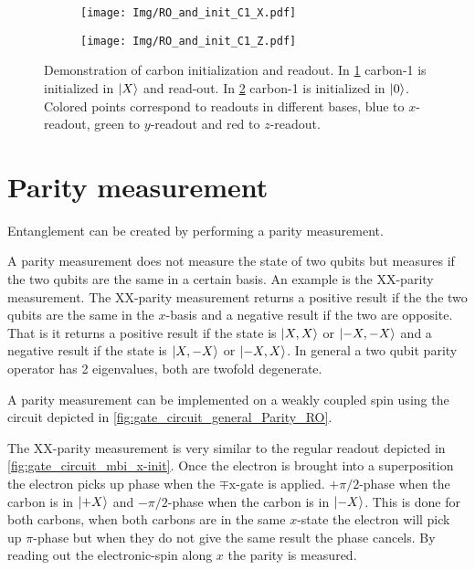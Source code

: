 \begin{figure}[htbp]
    \begin{subfigure}[t]{0.49\textwidth}\centering
        \caption{}
        \texttt{[image: Img/RO\_and\_init\_C1\_X.pdf]}
        \label{fig:carbon_init_x}
    \end{subfigure}
        \begin{subfigure}[t]{0.49\textwidth}\centering
        \caption{}
        \texttt{[image: Img/RO\_and\_init\_C1\_Z.pdf]}
        \label{fig:carbon_init_Z}
    \end{subfigure}
    \caption{Demonstration of carbon initialization and readout. In \cref{fig:carbon_init_x} carbon-1 is initialized in ${\left\vert{X}\right\rangle}$ and read-out. In \cref{fig:carbon_init_Z} carbon-1 is initialized in ${\left\vert{0}\right\rangle}$. Colored points correspond to readouts in different bases, blue to $x$-readout, green to $y$-readout and red to $z$-readout.}
    \label{fig:single_qubit_initialization}
\end{figure}


\section{Parity measurement}
Entanglement can be created by performing a parity measurement.

A parity measurement does not measure the state of two qubits but measures if the two qubits are the same in a certain basis.
An example is the XX-parity measurement.
The XX-parity measurement returns a positive result if the the two qubits are the same in the $x$-basis and a negative result if the two are opposite.
That is it returns a positive result if the state is ${\left\vert{X,X}\right\rangle}$ or ${\left\vert{-X,-X}\right\rangle}$ and a negative result if the state is ${\left\vert{X,-X}\right\rangle}$ or ${\left\vert{-X,X}\right\rangle}$.
In general a two qubit parity operator has 2 eigenvalues, both are twofold degenerate.

A parity measurement can be implemented on a weakly coupled spin using the circuit depicted in \cref{fig:gate_circuit_general_Parity_RO}.

The XX-parity measurement is very similar to the regular readout depicted in \cref{fig:gate_circuit_mbi_x-init}.
Once the electron is brought into a superposition the electron picks up phase when the $\mp \mathrm{x}$-gate is applied.
$+\pi/2$-phase when the carbon is in ${\left\vert{+X}\right\rangle}$ and $-\pi/2$-phase when the carbon is in ${\left\vert{-X}\right\rangle}$.
This is done for both carbons, when both carbons are in the same $x$-state the electron will pick up $\pi$-phase but when they do not give the same result the phase cancels.
By reading out the electronic-spin along $x$ the parity is measured.

